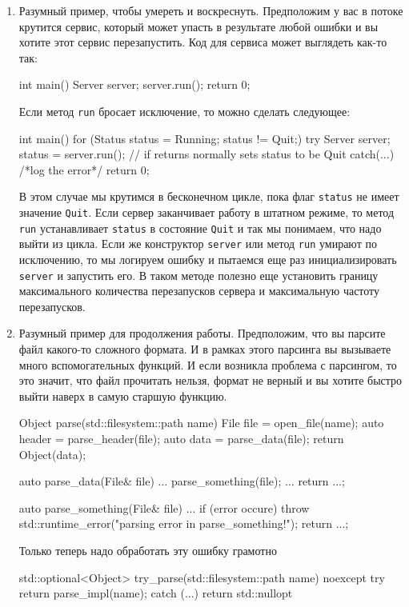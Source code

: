 \begin{enumerate}
\item Разумный пример, чтобы умереть и воскреснуть.
Предположим у вас в потоке крутится сервис, который может упасть в результате любой ошибки и вы хотите этот сервис перезапустить.
Код для сервиса может выглядеть как-то так:
\begin{cppcode}
int main() {
  Server server;
  server.run();
  return 0;
}
\end{cppcode}
Если метод \verb"run" бросает исключение, то можно сделать следующее:
\begin{cppcode}
int main() {
  for (Status status = Running; status != Quit;) {
    try {
      Server server;
      status = server.run(); // if returns normally sets status to be Quit
    } catch(...) {
      /*log the error*/
    }
  }
  return 0;
}
\end{cppcode}
В этом случае мы крутимся в бесконечном цикле, пока флаг \verb"status" не имеет значение \verb"Quit".
Если сервер заканчивает работу в штатном режиме, то метод \verb"run" устанавливает \verb"status" в состояние \verb"Quit" и так мы понимаем, что надо выйти из цикла.
Если же конструктор \verb"server" или метод \verb"run" умирают по исключению, то мы логируем ошибку и пытаемся еще раз инициализировать \verb"server" и запустить его.
В таком методе полезно еще установить границу максимального количества перезапусков сервера и максимальную частоту перезапусков.

\item
\label{item::example::ExceptionLive}
Разумный пример для продолжения работы.
Предположим, что вы парсите файл какого-то сложного формата.
И в рамках этого парсинга вы вызываете много вспомогательных функций.
И если возникла проблема с парсингом, то это значит, что файл прочитать нельзя, формат не верный и вы хотите быстро выйти наверх в самую старшую функцию.
\begin{cppcode}
Object parse(std::filesystem::path name) {
  File file = open_file(name);
  auto header = parse_header(file);
  auto data = parse_data(file);
  return Object(data);
}

auto parse_data(File& file) {
  ...
  parse_something(file);
  ...
  return ...;
}

auto  parse_something(File& file) {
  ...
  if (error occure)
    throw std::runtime_error("parsing error in parse_something!");
  return ...;
}
\end{cppcode}
Только теперь надо обработать эту ошибку грамотно
\begin{cppcode}
std::optional<Object> try_parse(std::filesystem::path name) noexcept {
  try {
    return parse_impl(name);
  } catch (...) {
    return std::nullopt
  }
}


\end{cppcode}
\end{enumerate}
